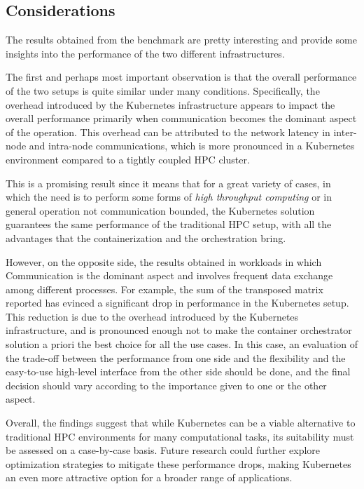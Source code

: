 \subsection{Considerations}

The results obtained from the benchmark are pretty interesting and provide some
insights into the performance of the two different infrastructures.

The first and perhaps most important observation is that the overall performance
of the two setups is quite similar under many conditions.
Specifically, the overhead introduced by the Kubernetes infrastructure appears
to impact the overall performance primarily when communication becomes the
dominant aspect of the operation. This overhead can be attributed to the network
latency in inter-node and intra-node communications, which is more pronounced in
a Kubernetes environment compared to a tightly coupled HPC cluster.

This is a promising result since it means that for a great variety of cases, in
which the need is to perform some forms of \textit{high throughput computing} or
in general operation not communication bounded, the Kubernetes solution
guarantees the same performance of the traditional HPC setup, with all the
advantages that the containerization and the orchestration bring.

However, on the opposite side, the results obtained in workloads in which
Communication is the dominant aspect and involves frequent data exchange among
different processes. For example, the sum of the transposed matrix reported has
evinced a significant drop in performance in the Kubernetes setup.
This reduction is due to the overhead introduced by the Kubernetes
infrastructure, and is pronounced enough not to make the container orchestrator
solution a priori the best choice for all the use cases.
In this case, an evaluation of the trade-off between the performance from one
side and the flexibility and the easy-to-use high-level interface from the other
side should be done, and the final decision should vary according to the
importance given to one or the other aspect.

Overall, the findings suggest that while Kubernetes can be a viable alternative
to traditional HPC environments for many computational tasks, its suitability
must be assessed on a case-by-case basis.
Future research could further explore optimization strategies to mitigate these
performance drops, making Kubernetes an even more attractive option for a
broader range of applications.
